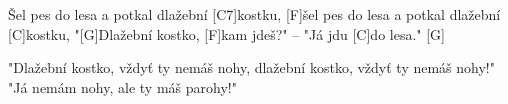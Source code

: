 
\sloka
[C]Šel pes do lesa a potkal dlažební [C7]kostku,
[F]šel pes do lesa a potkal dlažební [C]kostku,
"[G]Dlažební kostko, [F]kam jdeš?" – "Já jdu [C]do lesa." [G]

\sloka
"Dlažební kostko, vždyť ty nemáš nohy,
dlažební kostko, vždyť ty nemáš nohy!"
"Já nemám nohy, ale ty máš parohy!"
